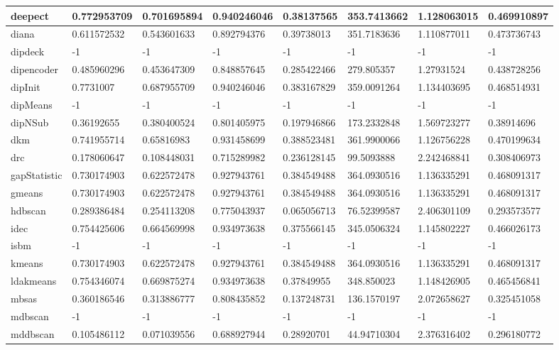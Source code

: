 \begin{table}[H]
\begin{tabular}{|l|l|l|l|l|l|l|l|}
\hline
deepect & 0.772953709 & 0.701695894 & 0.940246046 & 0.38137565 & 353.7413662 & 1.128063015 & 0.469910897 \\
\hline
diana & 0.611572532 & 0.543601633 & 0.892794376 & 0.39738013 & 351.7183636 & 1.110877011 & 0.473736743 \\
\hline
dipdeck & -1 & -1 & -1 & -1 & -1 & -1 & -1 \\
\hline
dipencoder & 0.485960296 & 0.453647309 & 0.848857645 & 0.285422466 & 279.805357 & 1.27931524 & 0.438728256 \\
\hline
dipInit & 0.7731007 & 0.687955709 & 0.940246046 & 0.383167829 & 359.0091264 & 1.134403695 & 0.468514931 \\
\hline
dipMeans & -1 & -1 & -1 & -1 & -1 & -1 & -1 \\
\hline
dipNSub & 0.36192655 & 0.380400524 & 0.801405975 & 0.197946866 & 173.2332848 & 1.569723277 & 0.38914696 \\
\hline
dkm & 0.741955714 & 0.65816983 & 0.931458699 & 0.388523481 & 361.9900066 & 1.126756228 & 0.470199634 \\
\hline
drc & 0.178060647 & 0.108448031 & 0.715289982 & 0.236128145 & 99.5093888 & 2.242468841 & 0.308406973 \\
\hline
gapStatistic & 0.730174903 & 0.622572478 & 0.927943761 & 0.384549488 & 364.0930516 & 1.136335291 & 0.468091317 \\
\hline
gmeans & 0.730174903 & 0.622572478 & 0.927943761 & 0.384549488 & 364.0930516 & 1.136335291 & 0.468091317 \\
\hline
hdbscan & 0.289386484 & 0.254113208 & 0.775043937 & 0.065056713 & 76.52399587 & 2.406301109 & 0.293573577 \\
\hline
idec & 0.754425606 & 0.664569998 & 0.934973638 & 0.375566145 & 345.0506324 & 1.145802227 & 0.466026173 \\
\hline
isbm & -1 & -1 & -1 & -1 & -1 & -1 & -1 \\
\hline
kmeans & 0.730174903 & 0.622572478 & 0.927943761 & 0.384549488 & 364.0930516 & 1.136335291 & 0.468091317 \\
\hline
ldakmeans & 0.754346074 & 0.669875274 & 0.934973638 & 0.37849955 & 348.850023 & 1.148426905 & 0.465456841 \\
\hline
mbsas & 0.360186546 & 0.313886777 & 0.808435852 & 0.137248731 & 136.1570197 & 2.072658627 & 0.325451058 \\
\hline
mdbscan & -1 & -1 & -1 & -1 & -1 & -1 & -1 \\
\hline
mddbscan & 0.105486112 & 0.071039556 & 0.688927944 & 0.28920701 & 44.94710304 & 2.376316402 & 0.296180772 \\

\end{tabular}
\end{table}
